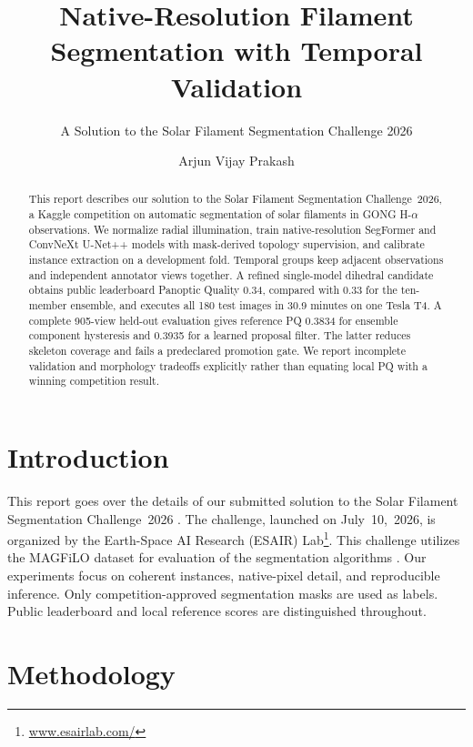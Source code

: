 \documentclass[sigconf]{acmart}
\begin{document}
\title{Native-Resolution Filament Segmentation with Temporal Validation}
\subtitle{A Solution to the Solar Filament Segmentation Challenge 2026}
\author{Arjun Vijay Prakash}
\begin{abstract}
This report describes our solution to the Solar Filament Segmentation Challenge~2026, a Kaggle competition on automatic segmentation of solar filaments in GONG H-$\alpha$ observations.
We normalize radial illumination, train native-resolution SegFormer and ConvNeXt U-Net++ models with mask-derived topology supervision, and calibrate instance extraction on a development fold. Temporal groups keep adjacent observations and independent annotator views together. A refined single-model dihedral candidate obtains public leaderboard Panoptic Quality 0.34, compared with 0.33 for the ten-member ensemble, and executes all 180 test images in 30.9 minutes on one Tesla T4. A complete 905-view held-out evaluation gives reference PQ 0.3834 for ensemble component hysteresis and 0.3935 for a learned proposal filter. The latter reduces skeleton coverage and fails a predeclared promotion gate. We report incomplete validation and morphology tradeoffs explicitly rather than equating local PQ with a winning competition result.
\end{abstract}
\maketitle
\section{Introduction}
This report goes over the details of our submitted solution to the Solar Filament Segmentation Challenge~2026 \cite{filament-segmentation-2026}. The challenge, launched on July~10,~2026, is organized by the Earth-Space AI Research (ESAIR) Lab\footnote{\href{https://www.esairlab.com/home}{www.esairlab.com/}}. This challenge utilizes the MAGFiLO dataset for evaluation of the segmentation algorithms \cite{ahmadzadeh2024dataset}.
Our experiments focus on coherent instances, native-pixel detail, and reproducible inference. Only competition-approved segmentation masks are used as labels. Public leaderboard and local reference scores are distinguished throughout.

\section{Methodology}
\end{document}
